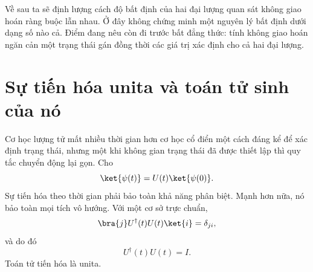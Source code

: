 Về sau ta sẽ định lượng cách độ bất định của hai đại lượng quan sát không giao hoán ràng buộc lẫn nhau. Ở đây không chứng minh một nguyên lý bất định dưới dạng số nào cả. Điểm đang nêu còn đi trước bất đẳng thức: tính không giao hoán ngăn cản một trạng thái gán đồng thời các giá trị xác định cho cả hai đại lượng.

\begin{classroomqa}
\end{classroomqa}

\begin{classroomqa}
\end{classroomqa}

\section{Sự tiến hóa unita và toán tử sinh của nó}

Cơ học lượng tử mất nhiều thời gian hơn cơ học cổ điển một cách đáng kể để xác định trạng thái, nhưng một khi không gian trạng thái đã được thiết lập thì quy tắc chuyển động lại gọn. Cho
\begin{equation}
\ket{\psi(t)}=U(t)\ket{\psi(0)}.
\label{eq:l5-propagator}
\end{equation}
Sự tiến hóa theo thời gian phải bảo toàn khả năng phân biệt. Mạnh hơn nữa, nó bảo toàn mọi tích vô hướng. Với một cơ sở trực chuẩn,
\begin{equation}
\bra{j}U^\dagger(t)U(t)\ket{i}=\delta_{ji},
\end{equation}
và do đó
\begin{equation}
U^\dagger(t)U(t)=I.
\label{eq:l5-unitarity}
\end{equation}
Toán tử tiến hóa là unita.

